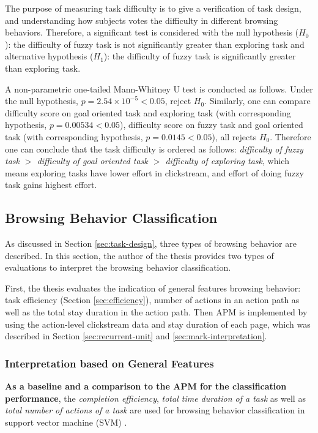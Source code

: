The purpose of measuring task difficulty is to give a verification of task design,
and understanding how subjects votes the difficulty in different browsing behaviors.
Therefore, a significant test is considered with the null hypothesis ($H_0$): 
the difficulty of fuzzy task is not significantly greater than exploring task 
and alternative hypothesis ($H_1$): 
the difficulty of fuzzy task is significantly greater than exploring task. 

A non-parametric one-tailed Mann-Whitney U test \cite{mann1947test} is conducted as follows. 
Under the null hypothesis, $p=2.54\times 10^{-5} < 0.05$, reject $H_0$.
Similarly, one can compare difficulty score on goal oriented task and exploring task (with corresponding hypothesis, 
$p=0.00534 < 0.05$), difficulty score on fuzzy task and goal oriented task (with corresponding hypothesis, 
$p=0.0145 < 0.05$), all rejects $H_0$. Therefore one can conclude that the task difficulty is ordered
as follows: \emph{difficulty of fuzzy task $>$ difficulty of goal oriented task $>$ difficulty of exploring task},
which means exploring tasks have lower effort in clickstream, and effort of doing fuzzy task gains highest effort.

\subsection{Browsing Behavior Classification}

As discussed in Section \ref{sec:task-design}, three types of browsing behavior are described. 
In this section, the author of the thesis provides two types of evaluations to 
interpret the browsing behavior classification.

First, the thesis evaluates the indication of general features browsing behavior:
task efficiency (Section \ref{sec:efficiency}), 
number of actions in an action path 
as well as the total stay duration in the action path.
Then APM is implemented by using the action-level clickstream data and stay duration of each page,
which was described in Section \ref{sec:recurrent-unit} and \ref{sec:mark-interpretation}.

\subsubsection{Interpretation based on General Features}
\label{sec:inter-general-feature}

\textbf{As a baseline and a comparison to the APM for the classification performance}, 
the \emph{completion efficiency}, 
\emph{total time duration of a task} 
as well as \emph{total number of actions of a task} are used for
browsing behavior classification in support vector machine (SVM) \cite{suykens1999least}.

